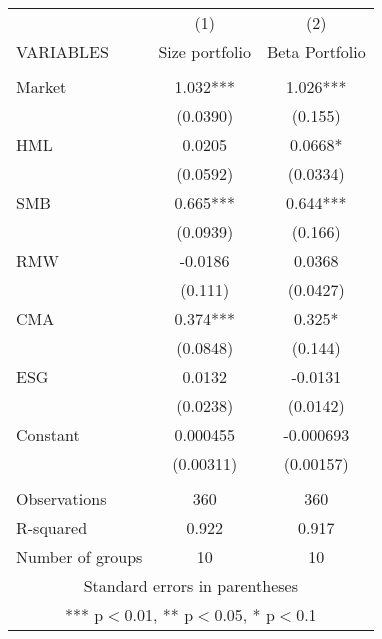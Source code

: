 \begin{tabular}{lcc} \hline
 & (1) & (2) \\
VARIABLES & Size portfolio & Beta Portfolio \\ \hline
 &  &  \\
Market & 1.032*** & 1.026*** \\
 & (0.0390) & (0.155) \\
HML & 0.0205 & 0.0668* \\
 & (0.0592) & (0.0334) \\
SMB & 0.665*** & 0.644*** \\
 & (0.0939) & (0.166) \\
RMW & -0.0186 & 0.0368 \\
 & (0.111) & (0.0427) \\
CMA & 0.374*** & 0.325* \\
 & (0.0848) & (0.144) \\
ESG & 0.0132 & -0.0131 \\
 & (0.0238) & (0.0142) \\
Constant & 0.000455 & -0.000693 \\
 & (0.00311) & (0.00157) \\
 &  &  \\
Observations & 360 & 360 \\
R-squared & 0.922 & 0.917 \\
 Number of groups & 10 & 10 \\ \hline
\multicolumn{3}{c}{ Standard errors in parentheses} \\
\multicolumn{3}{c}{ *** p$<$0.01, ** p$<$0.05, * p$<$0.1} \\
\end{tabular}
